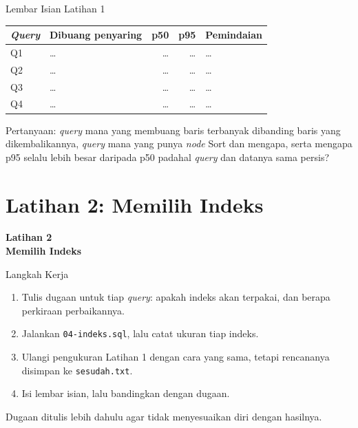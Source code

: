 \documentclass[aspectratio=169, table, 12pt]{beamer}
\begin{document}
\begin{frame}{{\Large Lembar Isian Latihan 1}}
  \vspace{5pt}
  {\centering
  {\small
  \begin{tabularx}{\textwidth}{lXrrl}
    \hline
    \textbf{\textit{Query}} & \textbf{Dibuang penyaring} & \textbf{p50} & \textbf{p95} & \textbf{Pemindaian} \\
    \hline
    Q1 & \dots & \dots & \dots & \dots \\
    \hline
    Q2 & \dots & \dots & \dots & \dots \\
    \hline
    Q3 & \dots & \dots & \dots & \dots \\
    \hline
    Q4 & \dots & \dots & \dots & \dots \\
    \hline
  \end{tabularx}}\par}

  \vspace{8pt}
  {\footnotesize Pertanyaan: \textit{query} mana yang membuang baris terbanyak
  dibanding baris yang dikembalikannya, \textit{query} mana yang punya \textit{node} Sort dan
  mengapa, serta mengapa p95 selalu lebih besar daripada p50 padahal \textit{query}
  dan datanya sama persis?}
\end{frame}

\section{Latihan 2: Memilih Indeks}

\begin{frame}{\hfill}
  \centering
  \Huge{\textbf{Latihan 2\\Memilih Indeks}}
\end{frame}

\begin{frame}{{\Large Langkah Kerja}}
  \vspace{5pt}
  \begin{enumerate}
    \item Tulis dugaan untuk tiap \textit{query}: apakah indeks akan terpakai, dan
          berapa perkiraan perbaikannya.
    \item Jalankan \texttt{04-indeks.sql}, lalu catat ukuran tiap indeks.
    \item Ulangi pengukuran Latihan 1 dengan cara yang sama, tetapi
          rencananya disimpan ke \texttt{sesudah.txt}.
    \item Isi lembar isian, lalu bandingkan dengan dugaan.
  \end{enumerate}
  \vspace{4pt}
  {\footnotesize Dugaan ditulis lebih dahulu agar tidak menyesuaikan diri
  dengan hasilnya.}
\end{frame}
\end{document}
